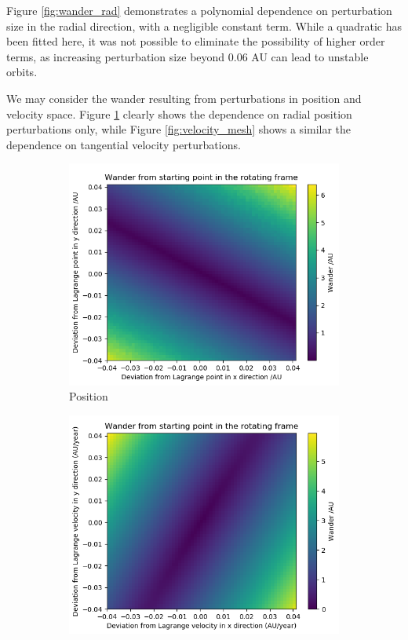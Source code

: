 \documentclass[11pt, a4paper,twocolumn]{article} %
\begin{document}
Figure \ref{fig:wander_rad} demonstrates a polynomial dependence on perturbation size in the radial direction, with a negligible constant term. While a quadratic has been fitted here, it was not possible to eliminate the possibility of higher order terms, as increasing perturbation size beyond 0.06 AU can lead to unstable orbits.

We may consider the wander resulting from perturbations in position and velocity space. Figure \ref{fig:position_mesh} clearly shows the dependence on radial position perturbations only, while Figure \ref{fig:velocity_mesh} shows a similar the dependence on tangential velocity perturbations.

\begin{figure}[ht]
	\centering
	\begin{subfigure}{.45\textwidth}
		\centering
		\includegraphics[width=\linewidth]{Figures/testcolourmesh6}  
		\caption{Position}
		\label{fig:position_mesh}
	\end{subfigure}
	\hfill %
	\begin{subfigure}{.45\textwidth}
		\centering
		\includegraphics[width=\linewidth]{Figures/testvelocitymesh2}  

\end{subfigure}
\end{figure}
\end{document}
